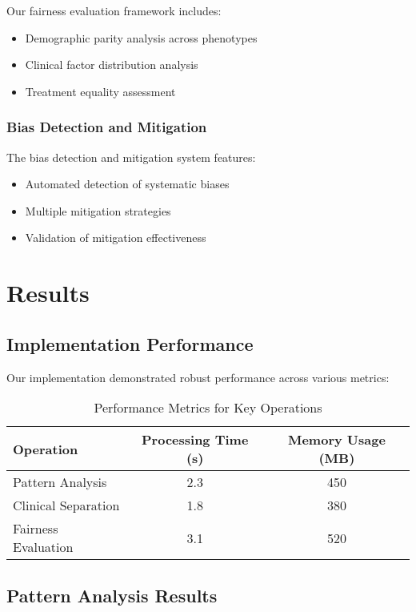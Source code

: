 \documentclass[12pt]{article}
\begin{document}
Our fairness evaluation framework includes:
\begin{itemize}
    \item Demographic parity analysis across phenotypes
    \item Clinical factor distribution analysis
    \item Treatment equality assessment
\end{itemize}

\subsubsection{Bias Detection and Mitigation}

The bias detection and mitigation system features:
\begin{itemize}
    \item Automated detection of systematic biases
    \item Multiple mitigation strategies
    \item Validation of mitigation effectiveness
\end{itemize}

\section{Results}

\subsection{Implementation Performance}

Our implementation demonstrated robust performance across various metrics:

\begin{table}[htbp]
\centering
\caption{Performance Metrics for Key Operations}
\begin{tabular}{lcc}
\toprule
Operation & Processing Time (s) & Memory Usage (MB) \\
\midrule
Pattern Analysis & 2.3 & 450 \\
Clinical Separation & 1.8 & 380 \\
Fairness Evaluation & 3.1 & 520 \\
\bottomrule
\end{tabular}
\label{tab:performance}
\end{table}

\subsection{Pattern Analysis Results}
\end{document}
